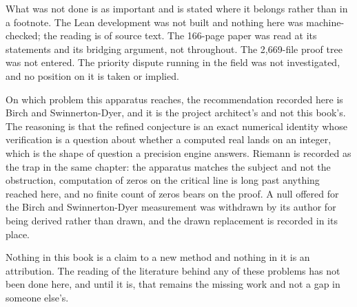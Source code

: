 What was not done is as important and is stated where it belongs rather than in a footnote. The Lean
development was not built and nothing here was machine-checked; the reading is of source text. The
166-page paper was read at its statements and its bridging argument, not throughout. The
2,669-file proof tree was not entered. The priority dispute running in the field was not
investigated, and no position on it is taken or implied.

On which problem this apparatus reaches, the recommendation recorded here is Birch and
Swinnerton-Dyer, and it is the project architect's and not this book's. The reasoning is that the
refined conjecture is an exact numerical identity whose verification is a question about whether a
computed real lands on an integer, which is the shape of question a precision engine answers.
Riemann is recorded as the trap in the same chapter: the apparatus matches the subject and not the
obstruction, computation of zeros on the critical line is long past anything reached here, and no
finite count of zeros bears on the proof. A null offered for the Birch and Swinnerton-Dyer
measurement was withdrawn by its author for being derived rather than drawn, and the drawn
replacement is recorded in its place.

Nothing in this book is a claim to a new method and nothing in it is an attribution. The reading of
the literature behind any of these problems has not been done here, and until it is, that remains
the missing work and not a gap in someone else's.
\cleardoublepage
